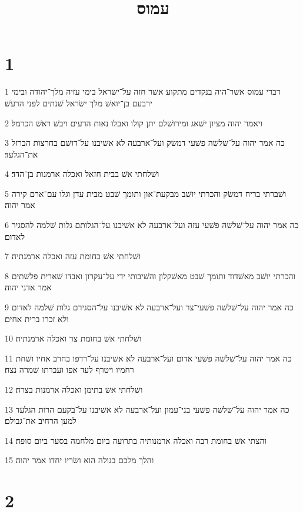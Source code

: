 

\title{עמוס}


\chapter{1}

\par 1 דברי עמוס אשׁר־היה בנקדים מתקוע אשׁר חזה על־ישׂראל בימי עזיה מלך־יהודה ובימי ירבעם בן־יואשׁ מלך ישׂראל שׁנתים לפני הרעשׁ׃
\par 2 ויאמר יהוה מציון ישׁאג ומירושׁלם יתן קולו ואבלו נאות הרעים ויבשׁ ראשׁ הכרמל׃
\par 3 כה אמר יהוה על־שׁלשׁה פשׁעי דמשׂק ועל־ארבעה לא אשׁיבנו על־דושׁם בחרצות הברזל את־הגלעד׃
\par 4 ושׁלחתי אשׁ בבית חזאל ואכלה ארמנות בן־הדד׃
\par 5 ושׁברתי בריח דמשׂק והכרתי יושׁב מבקעת־און ותומך שׁבט מבית עדן וגלו עם־ארם קירה אמר יהוה׃
\par 6 כה אמר יהוה על־שׁלשׁה פשׁעי עזה ועל־ארבעה לא אשׁיבנו על־הגלותם גלות שׁלמה להסגיר לאדום׃
\par 7 ושׁלחתי אשׁ בחומת עזה ואכלה ארמנתיה׃
\par 8 והכרתי יושׁב מאשׁדוד ותומך שׁבט מאשׁקלון והשׁיבותי ידי על־עקרון ואבדו שׁארית פלשׁתים אמר אדני יהוה׃
\par 9 כה אמר יהוה על־שׁלשׁה פשׁעי־צר ועל־ארבעה לא אשׁיבנו על־הסגירם גלות שׁלמה לאדום ולא זכרו ברית אחים׃
\par 10 ושׁלחתי אשׁ בחומת צר ואכלה ארמנתיה׃
\par 11 כה אמר יהוה על־שׁלשׁה פשׁעי אדום ועל־ארבעה לא אשׁיבנו על־רדפו בחרב אחיו ושׁחת רחמיו ויטרף לעד אפו ועברתו שׁמרה נצח׃
\par 12 ושׁלחתי אשׁ בתימן ואכלה ארמנות בצרה׃
\par 13 כה אמר יהוה על־שׁלשׁה פשׁעי בני־עמון ועל־ארבעה לא אשׁיבנו על־בקעם הרות הגלעד למען הרחיב את־גבולם׃
\par 14 והצתי אשׁ בחומת רבה ואכלה ארמנותיה בתרועה ביום מלחמה בסער ביום סופה׃
\par 15 והלך מלכם בגולה הוא ושׂריו יחדו אמר יהוה׃

\chapter{2}

